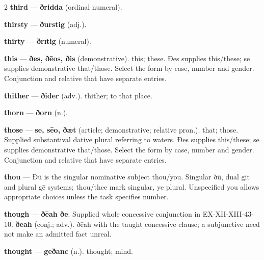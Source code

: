 \begin{multicols}{2}
\textbf{third} — \textbf{ðridda} (ordinal numeral).\par
\textbf{thirsty} — \textbf{ðurstig} (adj.).\par
\textbf{thirty} — \textbf{ðrītig} (numeral).\par
\textbf{this} — \textbf{ðes, ðēos, ðis} (demonstrative). this; these. Ðes supplies this/these; se supplies demonstrative that/those. Select the form by case, number and gender. Conjunction and relative that have separate entries.\par
\textbf{thither} — \textbf{ðider} (adv.). thither; to that place.\par
\textbf{thorn} — \textbf{ðorn} (n.).\par
\textbf{those} — \textbf{se, sēo, ðæt} (article; demonstrative; relative pron.). that; those. Supplied substantival dative plural referring to waters. Ðes supplies this/these; se supplies demonstrative that/those. Select the form by case, number and gender. Conjunction and relative that have separate entries.\par
\textbf{thou} — Ðū is the singular nominative subject thou/you. Singular ðū, dual git and plural gē systems; thou/thee mark singular, ye plural. Unspecified you allows appropriate choices unless the task specifies number.\par
\textbf{though} — \textbf{ðēah ðe}. Supplied whole concessive conjunction in EX-XII-XIII-43-10. \textbf{ðēah} (conj.; adv.). ðēah with the taught concessive clause; a subjunctive need not make an admitted fact unreal.\par
\textbf{thought} — \textbf{geðanc} (n.). thought; mind.\par

\end{multicols}
